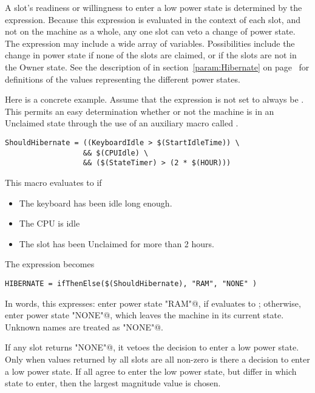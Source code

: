 A slot's readiness or willingness to enter a low power state is 
determined by the  expression. 
Because this expression is evaluated in the context of each slot,
and not on the machine as a whole, 
any one slot can veto a change of power state.  
The  expression may include a wide array of variables.
Possibilities include the change in power state if 
none of the slots are claimed, or if the slots are not in the
Owner state.
See the description of  in
section~\ref{param:Hibernate} on page~\pageref{param:Hibernate}
for definitions of the values representing the different
power states.

Here is a concrete example.
Assume that the  expression is not set to
always be .
This permits an easy determination whether or not
the machine is in an Unclaimed state through the use of
an auxiliary macro called .

\footnotesize
\begin{verbatim}
ShouldHibernate = ((KeyboardIdle > $(StartIdleTime)) \
                  && $(CPUIdle) \
                  && ($(StateTimer) > (2 * $(HOUR)))
\end{verbatim}
\normalsize

This macro evaluates to  if
\begin{itemize}
\item The keyboard has been idle long enough.
\item The CPU is idle
\item The slot has been Unclaimed for more than 2 hours.
\end{itemize}

The  expression becomes

\footnotesize
\begin{verbatim}
HIBERNATE = ifThenElse($(ShouldHibernate), "RAM", "NONE" )
\end{verbatim}
\normalsize

In words, this expresses:
enter power state \verb@"RAM"@,
if  evaluates to ; 
otherwise, enter power state \verb@"NONE"@,
which leaves the machine in its current state.   Unknown names are
treated as \verb@"NONE"@.

If any slot returns \verb@"NONE"@,
it vetoes the decision to enter a low power state.
Only when values returned by all slots are all non-zero 
is there a decision to enter a low power state.
If all agree to enter the low power state, but differ in which state to enter,
then the largest magnitude value is chosen. 


